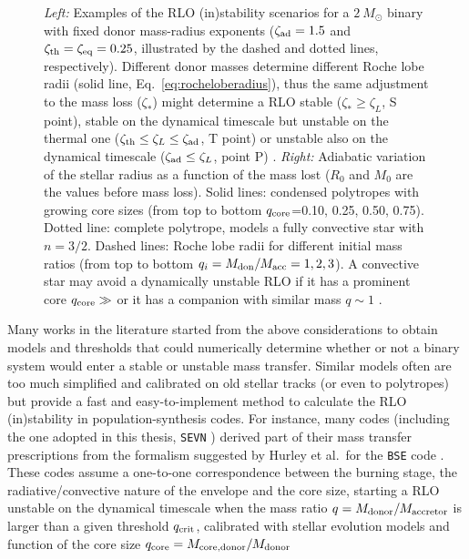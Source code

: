\documentclass[a4paper,titlepage]{book}     	%
\newcommand{\sun}{\ensuremath{_\odot}}
\newcommand{\msun}{\ensuremath{M\sun}}
\begin{document}
\begin{figure}
\begin{minipage}{.49\textwidth}
	\end{minipage}
	\caption{\emph{Left:} Examples of the RLO (in)stability scenarios for a $\SI{2}{\msun}$ binary with fixed donor mass-radius exponents ($\zeta_\textup{ad}=1.5$ and $\zeta_\textup{th}=\zeta_\textup{eq}=0.25$, illustrated  by the dashed and dotted lines, respectively). Different donor masses determine different Roche lobe radii (solid line, Eq.\ \ref{eq:rocheloberadius}), thus the same adjustment to the mass loss ($\zeta_*$) might determine a RLO stable ($\zeta_* \geq \zeta_L$, S point), stable on the dynamical timescale but unstable on the thermal one ($\zeta_\textup{th} \leq \zeta_L \leq \zeta_\textup{ad}$, T point) or unstable also on the dynamical timescale ($\zeta_\textup{ad} \leq \zeta_L$, point P) \cite{binaries}. \emph{Right:} Adiabatic variation of the stellar radius as a function of the mass lost ($R_0$ and $M_0$ are the values before mass loss). Solid lines: condensed polytropes with growing core sizes (from top to bottom $q_\textup{core}$=0.10, 0.25, 0.50, 0.75). Dotted line: complete polytrope, models a fully convective star with $n=3/2$. Dashed lines: Roche lobe radii for different initial mass ratios (from top to bottom $q_i=M_{\rm don}/M_{\rm acc}=1,2,3$). A convective star may avoid a dynamically unstable RLO if it has a prominent core $q_{\rm core} \gg$ or it has a companion with similar mass $q \sim 1$ \cite{hjellmingwebbink1987_coreRLOF}.}\label{fig:RLOstability}
\end{figure}


Many works in the literature started from the above considerations to obtain models and thresholds that could numerically determine whether or not a binary system would enter a stable or unstable mass transfer. Similar models often are too much simplified and calibrated on old stellar tracks (or even to polytropes) but provide a fast and easy-to-implement method to calculate the RLO (in)stability in population-synthesis codes. For instance, many codes (including the one adopted in this thesis, \texttt{SEVN} \cite{spera2019_mergingBBH}) derived part of their mass transfer prescriptions from the formalism suggested by Hurley et al.\ for the \texttt{BSE} code \cite{Hurley2002}. These codes assume a one-to-one correspondence between the burning stage, the radiative/convective nature of the envelope and the core size, starting a RLO unstable on the dynamical timescale when the mass ratio $q=M_{\rm donor}/M_{\rm accretor}$ is larger than a given threshold $q_{\rm crit}$, calibrated with stellar evolution models and function of the core size $q_{\rm core}=M_{\rm core, donor}/M_{\rm donor}$
\end{document}
